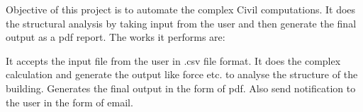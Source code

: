 Objective of this project is to automate the complex Civil computations. It does the structural analysis by taking input from the user and then generate the final output as a pdf report. The works it performs are:

It accepts the input file from the user in .csv file format.
It does the complex calculation and generate the output like force etc. to analyse the structure of the building.
Generates the final output in the form of pdf.
Also send notification to the user in the form of email.

